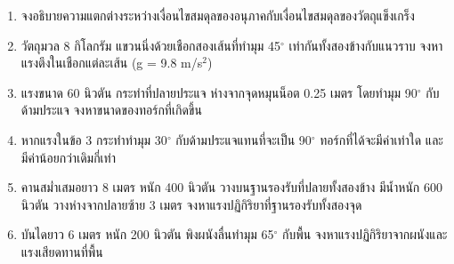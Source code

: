 \begin{enumerate}
    \item จงอธิบายความแตกต่างระหว่างเงื่อนไขสมดุลของอนุภาคกับเงื่อนไขสมดุลของวัตถุแข็งเกร็ง
    \item วัตถุมวล 8 กิโลกรัม แขวนนิ่งด้วยเชือกสองเส้นที่ทำมุม 45$^\circ$ เท่ากันทั้งสองข้างกับแนวราบ จงหาแรงตึงในเชือกแต่ละเส้น (g = 9.8 m/s$^2$)
    \item แรงขนาด 60 นิวตัน กระทำที่ปลายประแจ ห่างจากจุดหมุนน็อต 0.25 เมตร โดยทำมุม 90$^\circ$ กับด้ามประแจ จงหาขนาดของทอร์กที่เกิดขึ้น
    \item หากแรงในข้อ 3 กระทำทำมุม 30$^\circ$ กับด้ามประแจแทนที่จะเป็น 90$^\circ$ ทอร์กที่ได้จะมีค่าเท่าใด และมีค่าน้อยกว่าเดิมกี่เท่า
    \item คานสม่ำเสมอยาว 8 เมตร หนัก 400 นิวตัน วางบนฐานรองรับที่ปลายทั้งสองข้าง มีน้ำหนัก 600 นิวตัน วางห่างจากปลายซ้าย 3 เมตร จงหาแรงปฏิกิริยาที่ฐานรองรับทั้งสองจุด
    \item บันไดยาว 6 เมตร หนัก 200 นิวตัน พิงผนังลื่นทำมุม 65$^\circ$ กับพื้น จงหาแรงปฏิกิริยาจากผนังและแรงเสียดทานที่พื้น
\end{enumerate}

